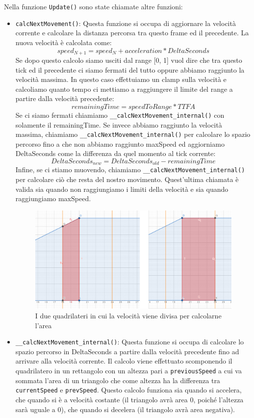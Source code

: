 \documentclass[main.tex]{subfiles}
\begin{document}
Nella funzione \lstinline{Update()} sono state chiamate altre funzioni:
\begin{itemize}
    \item \lstinline{calcNextMovement()}: Questa funzione si occupa di aggiornare la velocità corrente e calcolare la distanza percorsa tra questo frame ed il precedente. La nuova velocità è calcolata come:
    \[speed_{N+1} = speed_{N} + acceleration * DeltaSeconds\]
    Se dopo questo calcolo siamo usciti dal range [0, 1] vuol dire che tra questo tick ed il precedente ci siamo fermati del tutto oppure abbiamo raggiunto la velocità massima. In questo caso effettuiamo un clamp sulla velocità e calcoliamo quanto tempo ci mettiamo a raggiungere il limite del range a partire dalla velocità precedente:
    \[remainingTime = speedToRange * TTFA\]
    Se ci siamo fermati chiamiamo \lstinline{__calcNextMovement_internal()} con solamente il remainingTime. Se invece abbiamo raggiunto la velocità massima, chiamiamo \lstinline{__calcNextMovement_internal()} per calcolare lo spazio percorso fino a che non abbiamo raggiunto maxSpeed ed aggiorniamo DeltaSeconds come la differenza da quel momento al tick corrente:
    \[DeltaSeconds_{new} = DeltaSeconds_{old} - remainingTime\]
    Infine, se ci stiamo muovendo, chiamiamo \lstinline{__calcNextMovement_internal()} per calcolare ciò che resta del nostro movimento. Quest'ultima chiamata è valida sia quando non raggiungiamo i limiti della velocità e sia quando raggiungiamo maxSpeed.
    \begin{figure}[H]
        \centering
        \includegraphics[width=.8\linewidth]{img/interpolazione/calcNextMovementLateCall.png}
        \caption{I due quadrilateri in cui la velocità viene divisa per calcolarne l'area}
        \label{fig:4_calcNextMovementLateCall}
    \end{figure}
    \item \lstinline{__calcNextMovement_internal()}: Questa funzione si occupa di calcolare lo spazio percorso in DeltaSeconds a partire dalla velocità precedente fino ad arrivare alla velocità corrente. Il calcolo viene effettuato scomponendo il quadrilatero in un rettangolo con un altezza pari a \lstinline{previousSpeed} a cui va sommata l'area di un triangolo che come altezza ha la differenza tra \lstinline{currentSpeed} e \lstinline{prevSpeed}. Questo calcolo funziona sia quando si accelera, che quando si è a velocità costante (il triangolo avrà area 0, poiché l'altezza sarà uguale a 0), che quando si decelera (il triangolo avrà area negativa).

\end{itemize}
\end{document}
